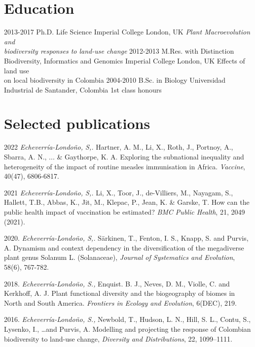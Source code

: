 \documentclass[icon]{twentysecondcv}
\begin{document}
\section{Education}

\begin{twenty}
  \twentyitem
    {2013-2017}
    {Ph.D. {\normalfont Life Science}}
    {Imperial College London, UK}
    {\emph{Plant Macroevolution and \\  biodiversity responses to land-use change}}
  \twentyitem
    {2012-2013}
    {M.Res. with Distinction \\  {\normalfont Biodiversity, Informatics and Genomics}}
    {Imperial College London, UK}
    {Effects of land use  \\  on local biodiversity in Colombia}
  \twentyitem
    {2004-2010}
    {B.Sc. in Biology}
    {Universidad Industrial de Santander, Colombia}
    {1st class honours}
 \end{twenty}
 
 
 \section{Selected publications}

2022 \textit{Echeverr\'ia-Londo\~no, S,.}  Hartner, A. M., Li, X., Roth, J., Portnoy, A., Sbarra, A. N., ... \& Gaythorpe, K. A. Exploring the subnational inequality and heterogeneity of the impact of routine measles immunisation in Africa. \textit{Vaccine}, 40(47), 6806-6817. 

2021 \textit{Echeverr\'ia-Londo\~no, S,.}  Li, X., Toor, J., de-Villiers, M., Nayagam, S., Hallett, T.B., Abbas, K., Jit, M., Klepac, P., Jean, K. \&  Garske, T. How can the public health impact of vaccination be estimated? \textit{BMC Public Health}, 21, 2049 (2021).

2020. \textit{Echeverr\'ia-Londo\~no, S,.}  S{\"a}rkinen, T., Fenton, I. S., Knapp, S. and Purvis, A. Dynamism and context dependency in the diversification of the megadiverse plant genus Solanum L. (Solanaceae), \textit{Journal of Systematics and Evolution},  58(6), 767-782. 

2018. \textit{Echeverr\'ia-Londo\~no, S.,} Enquist. B. J., Neves, D. M., Violle, C. and Kerkhoff, A. J. Plant functional diversity and the biogeography of biomes in North and South America. \textit{Frontiers in Ecology and Evolution}, 6(DEC), 219.

2016. \textit{Echeverr\'ia-Londo\~no, S.,} Newbold, T., Hudson, L. N., Hill, S. L., Contu, S., Lysenko, I., \dots and Purvis, A. Modelling and projecting the response of Colombian biodiversity to land-use change, \textit{Diversity and Distributions}, 22, 1099--1111. 


\end{document}
